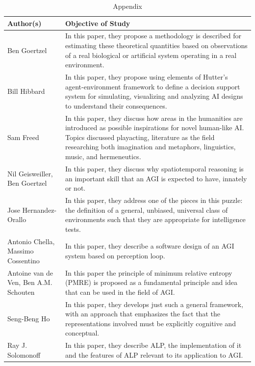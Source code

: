 \documentclass{article}
\begin{document}
\begin{table}
    \caption{Appendix}
    \centering

    \renewcommand{\arraystretch}{3}
    
    \begin{tabular}{ |p{5cm}|p{10cm}|  }
    \hline
    Author(s) & Objective of Study\\
    \hline
    
    Ben Goertzel & In this paper, they propose a methodology is described for estimating these theoretical quantities based on observations of a real biological or artificial system operating in a real environment. \\

    Bill Hibbard & In this paper, they propose using elements of Hutter's agent-environment framework to define a decision support system for simulating, visualizing and analyzing AI designs to understand their consequences. \\

    Sam Freed & In this paper, they discuss how areas in the humanities are introduced as possible inspirations for novel human-like AI. Topics discussed playacting, literature as the field researching both imagination and metaphors, linguistics, music, and hermeneutics. \\

    Nil Geisweiller, Ben Goertzel & In this paper, they discuss why spatiotemporal reasoning is an important skill that an AGI is expected to have, innately or not. \\


    Jose Hernandez-Orallo & In this paper, they address one of the pieces in this puzzle: the definition of a general, unbiased, universal class of environments such that they are appropriate for intelligence tests. \\

    Antonio Chella, Massimo Cossentino & In this paper, they describe a software design of an AGI system based on perception loop. \\

    Antoine van de Ven, Ben A.M. Schouten & In this paper the principle of minimum relative entropy (PMRE) is proposed as a fundamental principle and idea that can be used in the field of AGI. \\

    Seng-Beng Ho & In this paper, they develops just such a general framework, with an approach that emphasizes the fact that the representations involved must be explicitly cognitive and conceptual. \\

    Ray J. Solomonoff & In this paper, they describe ALP, the implementation of it and the features of ALP relevant to its application to AGI. \\

    \hline
    \end{tabular}
\end{table}
\end{document}
